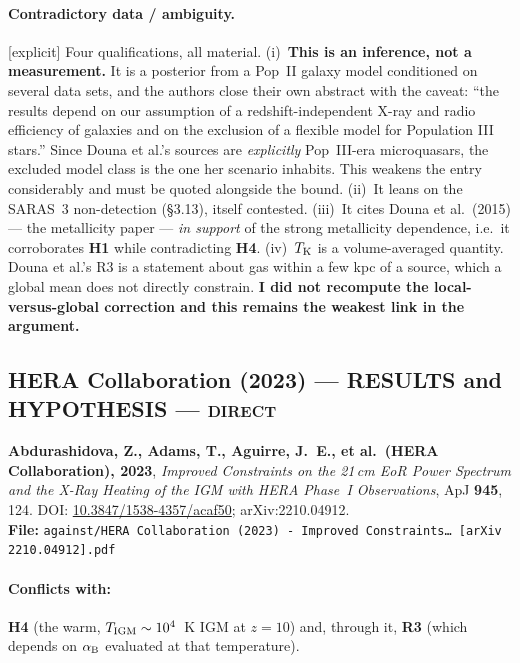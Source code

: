 \documentclass[11pt,a4paper]{article}
\newcommand{\HYP}{\textcolor{blue!60!black}{\textbf{HYPOTHESIS}}}
\newcommand{\RES}{\textcolor{red!60!black}{\textbf{RESULTS}}}
\newcommand{\flag}[1]{\textcolor{orange!75!black}{\textsf{\small [#1]}}}
\begin{document}
\paragraph{Contradictory data / ambiguity.} \flag{explicit}
Four qualifications, all material.
(i)~\textbf{This is an inference, not a measurement.} It is a posterior from a
Pop~II galaxy model conditioned on several data sets, and the authors close
their own abstract with the caveat: ``the results depend on our assumption of a
redshift-independent X-ray and radio efficiency of galaxies and on the exclusion
of a flexible model for Population III stars.'' Since Douna et al.'s sources are
\emph{explicitly} Pop~III-era microquasars, the excluded model class is the one
her scenario inhabits. This weakens the entry considerably and must be quoted
alongside the bound.
(ii)~It leans on the SARAS~3 non-detection (\S3.13), itself contested.
(iii)~It cites Douna et al.\ (2015) --- the metallicity paper --- \emph{in
support} of the strong metallicity dependence, i.e.\ it corroborates \textbf{H1}
while contradicting \textbf{H4}.
(iv)~$T_{\rm K}$ is a volume-averaged quantity. Douna et al.'s R3 is a statement
about gas within a few kpc of a source, which a global mean does not directly
constrain. \textbf{I did not recompute the local-versus-global correction and
this remains the weakest link in the argument.}

\subsection{HERA Collaboration (2023) --- \RES{} and \HYP{} --- \textsc{direct}}
\noindent\textbf{Abdurashidova, Z., Adams, T., Aguirre, J.~E., et al.\
(HERA Collaboration), 2023}, \emph{Improved Constraints on the 21\,cm EoR Power
Spectrum and the X-Ray Heating of the IGM with HERA Phase~I Observations},
ApJ \textbf{945}, 124. DOI:
\href{https://doi.org/10.3847/1538-4357/acaf50}{10.3847/1538-4357/acaf50};
arXiv:2210.04912.\\
\textbf{File:} \texttt{against/HERA Collaboration (2023) - Improved Constraints\dots\ [arXiv 2210.04912].pdf}

\paragraph{Conflicts with:} \textbf{H4} (the warm, $T_{\rm IGM}\sim10^{4}$~K
IGM at $z=10$) and, through it, \textbf{R3} (which depends on $\alpha_{\rm B}$
evaluated at that temperature).
\end{document}
